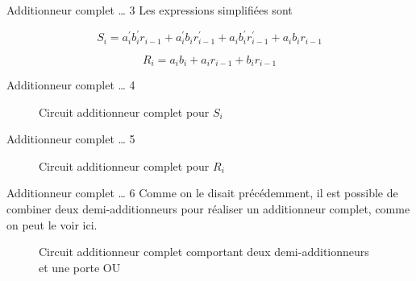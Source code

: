 \documentclass[presentation]{beamer}
\begin{document}
\begin{frame}[label={sec:orgc753bad}]{Additionneur complet \ldots{} 3}
Les expressions simplifiées sont 

$$ S_{i} = a_i^\prime b_i^\prime r_{i-1} + a_i^\prime b_i
r_{i-1}^\prime + a_i b_i^\prime r_{i-1}^\prime + a_i b_i r_{i-1} $$

$$ R_{i} = a_i b_i + a_i r_{i-1} + b_i r_{i-1} $$
\end{frame}

\begin{frame}[label={sec:org28d5e00}]{Additionneur complet \ldots{} 4}
\begin{figure}[htbp]
\centering

\caption{\label{fig:org14ccb9c}Circuit additionneur complet pour \(S_i\)}
\end{figure}
\end{frame}

\begin{frame}[label={sec:org3132ccd}]{Additionneur complet \ldots{} 5}
\begin{figure}[htbp]
\centering

\caption{\label{fig:orgea817c0}Circuit additionneur complet pour \(R_i\)}
\end{figure}
\end{frame}

\begin{frame}[label={sec:orgecfe44a}]{Additionneur complet \ldots{} 6}
Comme on le disait précédemment, il est possible de combiner deux
demi-additionneurs pour réaliser un additionneur complet, comme on
peut le voir ici.


\begin{figure}[htbp]
\centering

\caption{\label{fig:orgad9ef67}Circuit additionneur complet comportant deux demi-additionneurs et une porte OU}
\end{figure}
\end{frame}
\end{document}
